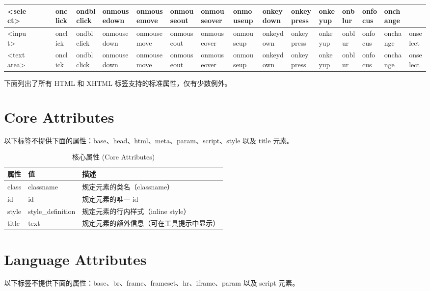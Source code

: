 \begin{longtable}{|p{18pt}|p{15pt}|p{15pt}|p{10pt}|p{16pt}|p{16pt}|p{16pt}|p{16pt}|p{16pt}|p{16pt}|p{16pt}|p{16pt}|p{16pt}|p{16pt}|p{16pt}|p{16pt}|p{16pt}|p{16pt}|}
\hline
<select>		&	&	&	& onclick	& ondblclick & onmousedown & onmousemove & onmouseout & onmouseover & onmouseup & onkeydown & onkeypress & onkeyup &onblur &onfocus &onchange & \\				
\hline
<input>		&	&	&	& onclick	& ondblclick & onmousedown & onmousemove & onmouseout & onmouseover & onmouseup & onkeydown & onkeypress & onkeyup &onblur &onfocus &onchange &onselect \\				
\hline
<textarea>	&	&	&	& onclick	& ondblclick & onmousedown & onmousemove & onmouseout & onmouseover & onmouseup & onkeydown & onkeypress & onkeyup &onblur &onfocus &onchange &onselect \\				
\hline
\end{longtable}



下面列出了所有 HTML 和 XHTML 标签支持的标准属性，仅有少数例外。

\section{Core Attributes}



以下标签不提供下面的属性：base、head、html、meta、param、script、style 以及 title 元素。

\begin{table}[!h]
\centering
\caption{核心属性 (Core Attributes)}
\begin{tabular}{|l|l|l|}
\hline
属性		&值			&描述\\
\hline
class	&classname	&规定元素的类名（classname）\\
\hline
id		&id			&规定元素的唯一 id\\
\hline
style	&style\_definition&	规定元素的行内样式（inline style）\\
\hline
title		&text		&规定元素的额外信息（可在工具提示中显示）\\
\hline
\end{tabular}
\end{table}


\section{Language Attributes}


以下标签不提供下面的属性：base、br、frame、frameset、hr、iframe、param 以及 script 元素。

